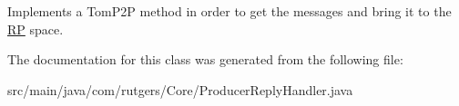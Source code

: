 Implements a Tom\+P2P method in order to get the messages and bring it to the \hyperlink{classcom_1_1rutgers_1_1Core_1_1RP}{RP} space. 

The documentation for this class was generated from the following file\+:\begin{DoxyCompactItemize}
\item 
src/main/java/com/rutgers/\+Core/Producer\+Reply\+Handler.\+java\end{DoxyCompactItemize}
